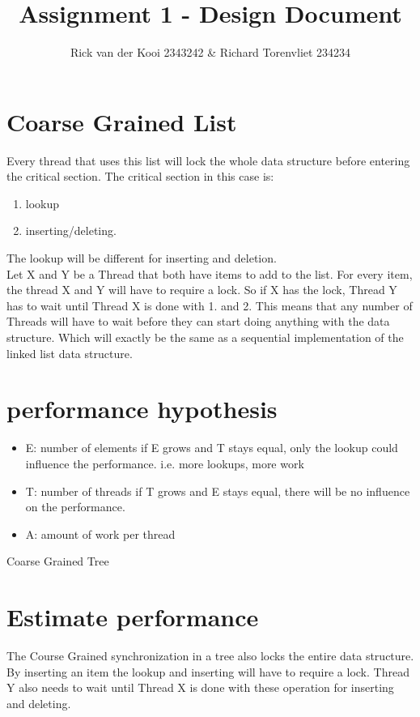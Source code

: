 \documentclass[10pt,a4paper]{article}
\author{Rick van der Kooi 2343242 \& Richard Torenvliet 234234}
\title{Assignment 1 - Design Document}
\begin{document}
\maketitle

\section{Coarse Grained List}
    Every thread that uses this list will lock the
    whole data structure before entering the critical section.
    The critical section in this case is: 
        \begin{enumerate}
        \item lookup
        \item inserting/deleting.
        \end{enumerate}
    The lookup will be different for inserting and deletion.
    \\
    Let X and Y be a Thread that both have items to add to the list. For every
    item, the thread X and Y will have to require a lock. So
    if X has the lock, Thread Y has to wait until Thread X is 
    done with 1. and 2.
    This means that any number of Threads will have to wait before they can start
    doing anything with the data structure. Which will exactly be the same
    as a sequential implementation of the linked list data structure.

\section{performance hypothesis}
\begin{itemize}
 \item E: number of elements 
    if E grows and T stays equal, only the lookup could influence the performance.
    i.e. more lookups, more work
 \item T: number of threads 
    if T grows and E stays equal, there will be no influence on the performance.
 \item  A: amount of work per thread
\end{itemize}

Coarse Grained Tree
\section{Estimate performance}
The Course Grained synchronization in a tree also locks the entire
data structure. By inserting an item the lookup and inserting will have to
require a lock. Thread Y also needs to wait until
Thread X is done with these operation for inserting and deleting.
\end{document}

